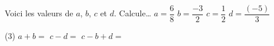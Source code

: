 %
%
Voici les valeurs de $a$, $b$, $c$ et $d$. Calcule\dots
  $a=\dfrac{6}{8}$
  $b=\dfrac{-3}{2}$
  $c=\dfrac{1}{2}$
  $d=\dfrac{(-5)}{3}$\\
  \begin{tasks} (3)
    \task $a+b=$
    \task $c-d=$
    \task $c-b+d=$
  \end{tasks}

